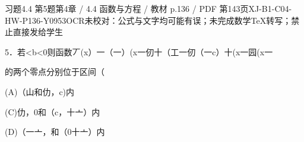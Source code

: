 \begin{bankitem}{习题4.4 第5题}{第4章 / 4.4 函数与方程 / 教材 p.136 / PDF 第143页}{XJ-B1-C04-HW-P136-Y0953}{OCR未校对：公式与文字均可能有误；未完成数学TeX转写；禁止直接发给学生}
\begin{ocrdraft}
\par
5．若<b<0则函数丆(x）一（一）(x一仞十（工一仞（一c）十(x一园(x一
\par
的两个零点分别位于区间（
\par
(A)（山和仂，c)内
\par
(C)仂，0和（c，十亠）内
\par
(D)（一亠，和（0十亠）内
\end{ocrdraft}
\end{bankitem}
